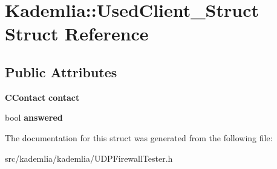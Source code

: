 \section{Kademlia::UsedClient\_\-Struct Struct Reference}
\label{structKademlia_1_1UsedClient__Struct}
\subsection*{Public Attributes}
\begin{DoxyCompactItemize}
\item 
{\bf CContact} {\bfseries contact}\label{structKademlia_1_1UsedClient__Struct_a96713e1d552d97f4e8c27bd7cf8672f3}

\item 
bool {\bfseries answered}\label{structKademlia_1_1UsedClient__Struct_ac0d8e10e7f39a635bbb1f75739974084}

\end{DoxyCompactItemize}


The documentation for this struct was generated from the following file:\begin{DoxyCompactItemize}
\item 
src/kademlia/kademlia/UDPFirewallTester.h\end{DoxyCompactItemize}
